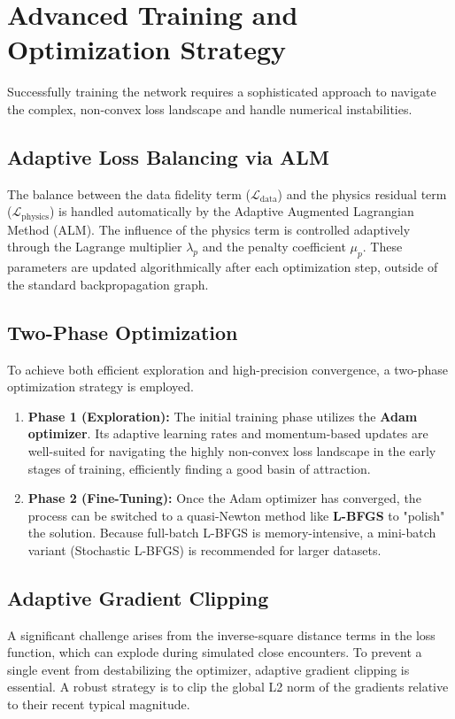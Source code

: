 \section{Advanced Training and Optimization Strategy}

Successfully training the network requires a sophisticated approach to navigate the complex, non-convex loss landscape and handle numerical instabilities.

\subsection{Adaptive Loss Balancing via ALM}
The balance between the data fidelity term ($\mathcal{L}_{\text{data}}$) and the physics residual term ($\mathcal{L}_{\text{physics}}$) is handled automatically by the Adaptive Augmented Lagrangian Method (ALM). The influence of the physics term is controlled adaptively through the Lagrange multiplier $\lambda_p$ and the penalty coefficient $\mu_p$. These parameters are updated algorithmically after each optimization step, outside of the standard backpropagation graph.

\subsection{Two-Phase Optimization}
To achieve both efficient exploration and high-precision convergence, a two-phase optimization strategy is employed.
\begin{enumerate}
    \item \textbf{Phase 1 (Exploration):} The initial training phase utilizes the \textbf{Adam optimizer}. Its adaptive learning rates and momentum-based updates are well-suited for navigating the highly non-convex loss landscape in the early stages of training, efficiently finding a good basin of attraction.
    \item \textbf{Phase 2 (Fine-Tuning):} Once the Adam optimizer has converged, the process can be switched to a quasi-Newton method like \textbf{L-BFGS} to "polish" the solution. Because full-batch L-BFGS is memory-intensive, a mini-batch variant (Stochastic L-BFGS) is recommended for larger datasets.
\end{enumerate}

\subsection{Adaptive Gradient Clipping}
A significant challenge arises from the inverse-square distance terms in the loss function, which can explode during simulated close encounters. To prevent a single event from destabilizing the optimizer, adaptive gradient clipping is essential. A robust strategy is to clip the global L2 norm of the gradients relative to their recent typical magnitude.

